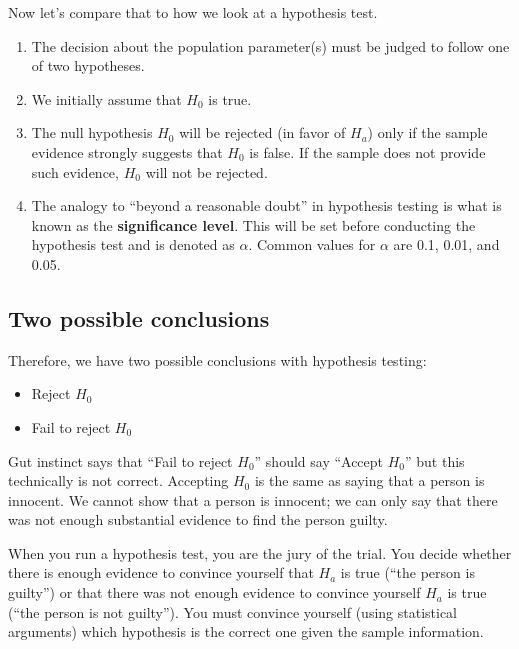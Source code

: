 \documentclass[]{tufte-book}
\providecommand{\tightlist}{%
  \setlength{\itemsep}{0pt}\setlength{\parskip}{0pt}}
\begin{document}
Now let's compare that to how we look at a hypothesis test.

\begin{enumerate}
\def\labelenumi{\arabic{enumi}.}
\item
  The decision about the population parameter(s) must be judged to
  follow one of two hypotheses.
\item
  We initially assume that \(H_0\) is true.
\item
  The null hypothesis \(H_0\) will be rejected (in favor of \(H_a\))
  only if the sample evidence strongly suggests that \(H_0\) is false.
  If the sample does not provide such evidence, \(H_0\) will not be
  rejected.
\item
  The analogy to ``beyond a reasonable doubt'' in hypothesis testing is
  what is known as the \textbf{significance level}. This will be set
  before conducting the hypothesis test and is denoted as \(\alpha\).
  Common values for \(\alpha\) are 0.1, 0.01, and 0.05.
\end{enumerate}

\subsection{Two possible conclusions}\label{two-possible-conclusions}

Therefore, we have two possible conclusions with hypothesis testing:

\begin{itemize}
\tightlist
\item
  Reject \(H_0\)\\
\item
  Fail to reject \(H_0\)
\end{itemize}

Gut instinct says that ``Fail to reject \(H_0\)'' should say ``Accept
\(H_0\)'' but this technically is not correct. Accepting \(H_0\) is the
same as saying that a person is innocent. We cannot show that a person
is innocent; we can only say that there was not enough substantial
evidence to find the person guilty.

When you run a hypothesis test, you are the jury of the trial. You
decide whether there is enough evidence to convince yourself that
\(H_a\) is true (``the person is guilty'') or that there was not enough
evidence to convince yourself \(H_a\) is true (``the person is not
guilty''). You must convince yourself (using statistical arguments)
which hypothesis is the correct one given the sample information.
\end{document}
